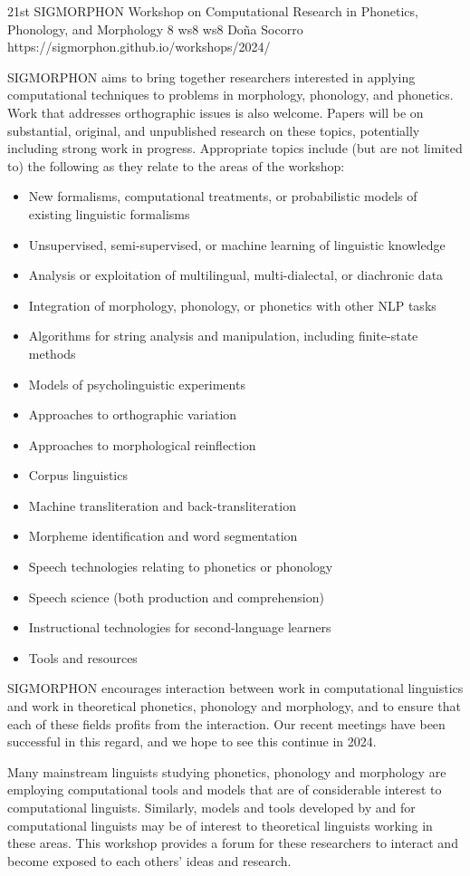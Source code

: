 \begin{wsschedulenolist}
{21st SIGMORPHON Workshop on Computational Research in Phonetics, Phonology, and Morphology}
{8}
{ws8}
{ws8}
{Do\~na Socorro}
{https://sigmorphon.github.io/workshops/2024/}

SIGMORPHON aims to bring together researchers interested in applying computational techniques to problems in morphology, phonology, and phonetics. Work that addresses orthographic issues is also welcome. Papers will be on substantial, original, and unpublished research on these topics, potentially including strong work in progress. Appropriate topics include (but are not limited to) the following as they relate to the areas of the workshop:

\begin{itemize}
    \setlength{\itemsep}{-0.3ex}
\item New formalisms, computational treatments, or probabilistic models of existing linguistic formalisms
\item Unsupervised, semi-supervised, or machine learning of linguistic knowledge
\item Analysis or exploitation of multilingual, multi-dialectal, or diachronic data
\item Integration of morphology, phonology, or phonetics with other NLP tasks
\item Algorithms for string analysis and manipulation, including finite-state methods
\item Models of psycholinguistic experiments
\item Approaches to orthographic variation
\item Approaches to morphological reinflection
\item Corpus linguistics
\item Machine transliteration and back-transliteration
\item Morpheme identification and word segmentation
\item Speech technologies relating to phonetics or phonology
\item Speech science (both production and comprehension)
\item Instructional technologies for second-language learners
\item Tools and resources
\end{itemize}

SIGMORPHON encourages interaction between work in computational linguistics and work in theoretical phonetics, phonology and morphology, and to ensure that each of these fields profits from the interaction. Our recent meetings have been successful in this regard, and we hope to see this continue in 2024.

Many mainstream linguists studying phonetics, phonology and morphology are employing computational tools and models that are of considerable interest to computational linguists. Similarly, models and tools developed by and for computational linguists may be of interest to theoretical linguists working in these areas. This workshop provides a forum for these researchers to interact and become exposed to each others’ ideas and research.

\end{wsschedulenolist}
